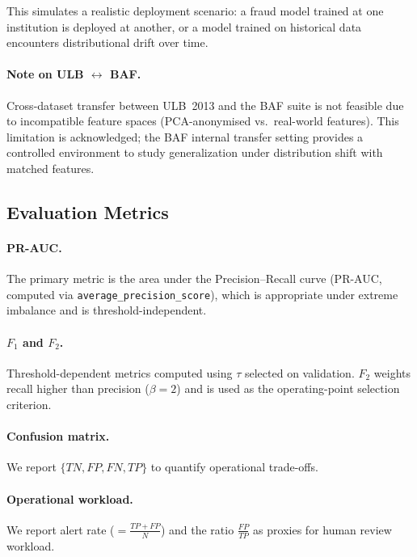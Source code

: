 This simulates a realistic deployment scenario: a fraud model trained at one institution is deployed at another, or a model trained on historical data encounters distributional drift over time.

\paragraph{Note on ULB $\leftrightarrow$ BAF.}
Cross-dataset transfer between ULB~2013 and the BAF suite is not feasible due to incompatible feature spaces (PCA-anonymised vs.\ real-world features). This limitation is acknowledged; the BAF internal transfer setting provides a controlled environment to study generalization under distribution shift with matched features.

\subsection{Evaluation Metrics}
\label{sec:metrics}

\paragraph{PR-AUC.}
The primary metric is the area under the Precision--Recall curve (PR-AUC, computed via \texttt{average\_precision\_score}), which is appropriate under extreme imbalance and is threshold-independent.

\paragraph{$F_1$ and $F_2$.}
Threshold-dependent metrics computed using $\tau$ selected on validation. $F_2$ weights recall higher than precision ($\beta=2$) and is used as the operating-point selection criterion.

\paragraph{Confusion matrix.}
We report $\{TN, FP, FN, TP\}$ to quantify operational trade-offs.

\paragraph{Operational workload.}
We report alert rate ($= \frac{TP+FP}{N}$) and the ratio $\frac{FP}{TP}$ as proxies for human review workload.

